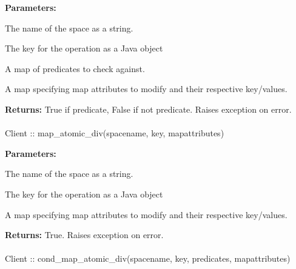 \noindent\textbf{Parameters:}
\begin{description}[labelindent=\widthof{{\code{mapattributes}}},leftmargin=*,noitemsep,nolistsep,align=right]
\item[\code{spacename}] The name of the space as a string.
\item[\code{key}] The key for the operation as a Java object
\item[\code{predicates}] A map of predicates to check against.
\item[\code{mapattributes}] A map specifying map attributes to modify and their respective key/values.
\end{description}

\noindent\textbf{Returns:}
True if predicate, False if not predicate.  Raises exception on error.

\paragraph{}
\label{api:java:map_atomic_div}
\begin{javacode}
Client :: map_atomic_div(spacename, key, mapattributes)
\end{javacode}
\funcdesc 

\noindent\textbf{Parameters:}
\begin{description}[labelindent=\widthof{{\code{mapattributes}}},leftmargin=*,noitemsep,nolistsep,align=right]
\item[\code{spacename}] The name of the space as a string.
\item[\code{key}] The key for the operation as a Java object
\item[\code{mapattributes}] A map specifying map attributes to modify and their respective key/values.
\end{description}

\noindent\textbf{Returns:}
True.  Raises exception on error.

\paragraph{}
\label{api:java:cond_map_atomic_div}
\begin{javacode}
Client :: cond_map_atomic_div(spacename, key, predicates, mapattributes)
\end{javacode}
\funcdesc 

